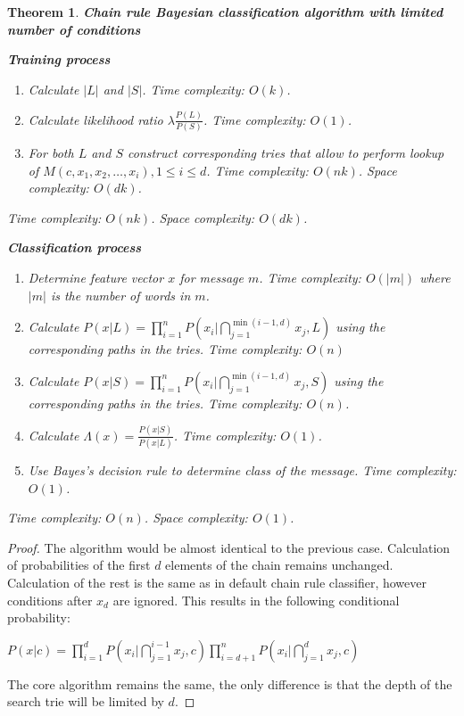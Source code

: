 \documentclass[12pt]{report}
\newtheorem{theorem}{Theorem}[section]
\begin{document}
\begin{theorem}
	\textbf{Chain rule Bayesian classification algorithm with limited number of conditions}
	
	\textbf{Training process}
	
	\begin{enumerate}
		\item Calculate $|L|$ and $|S|$. Time complexity: $O(k)$.
		\item Calculate likelihood ratio $\lambda \frac{P(L)}{P(S)}$. Time complexity: $O(1)$.
		\item For both $L$ and $S$ construct corresponding tries that allow to perform lookup of $M(c, x_1, x_2, \dots, x_i), 1 \le i \le d$. Time complexity: $O(nk)$. Space complexity: $O(dk)$.
	\end{enumerate}
	
	Time complexity: $O(nk)$. Space complexity: $O(dk)$.
	
	\textbf{Classification process}
	
	\begin{enumerate}
		\item Determine feature vector $x$ for message $m$. Time complexity: $O(|m|)$ where $|m|$ is the number of words in $m$.
		\item Calculate $P(x | L) = \prod_{i=1}^{n} P(x_i | \bigcap_{j = 1}^{\min(i - 1, d)} x_j, L)$ using the corresponding paths in the tries. Time complexity: $O(n)$
		\item Calculate $P(x | S) = \prod_{i=1}^{n} P(x_i | \bigcap_{j = 1}^{\min(i - 1, d)} x_j, S)$ using the corresponding paths in the tries. Time complexity: $O(n)$.
		\item Calculate $\Lambda(x) = \frac{P(x | S)}{P(x | L)}$. Time complexity: $O(1)$.
		\item Use Bayes's decision rule to determine class of the message. Time complexity: $O(1)$.
	\end{enumerate}
	
	Time complexity: $O(n)$. Space complexity: $O(1)$.
\end{theorem}

\begin{proof}
	The algorithm would be almost identical to the previous case. Calculation of probabilities of the first $d$ elements of the chain remains unchanged. Calculation of the rest is the same as in default chain rule classifier, however conditions after $x_d$ are ignored. This results in the following conditional probability:
	
	\begin{center}
		$P(x | c) = \prod_{i=1}^{d}P(x_i | \bigcap_{j = 1}^{i - 1} x_j, c) \prod_{i=d+1}^{n}P(x_i | \bigcap_{j = 1}^{d} x_j, c)$
	\end{center}
	
	The core algorithm remains the same, the only difference is that the depth of the search trie will be limited by $d$.
\end{proof}
\end{document}
